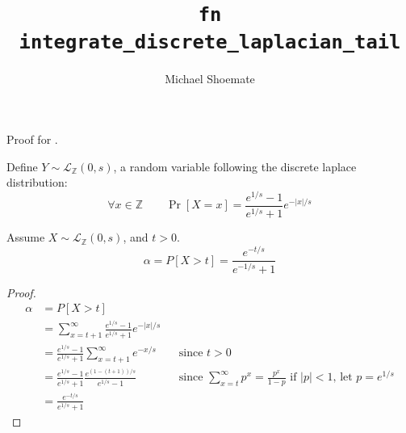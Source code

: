 \documentclass{article}
\title{\texttt{fn integrate\_discrete\_laplacian\_tail}}
\author{Michael Shoemate}
\begin{document}
\maketitle

Proof for .

\begin{definition}
    Define $Y \sim \mathcal{L}_\mathbb{Z}(0, s)$, a random variable following the discrete laplace distribution:
    \begin{equation}
        \forall x \in \mathbb{Z} \qquad \Pr[X = x] = \frac{e^{1/s} - 1}{e^{1/s} + 1} e^{-|x|/s}
    \end{equation}
\end{definition}

\begin{theorem}
    Assume $X \sim \mathcal{L}_\mathbb{Z}(0, s)$, and $t > 0$.
    \begin{equation}
        \alpha = P[X > t] = \frac{e^{-t/s}}{e^{-1/s} + 1}
    \end{equation}
\end{theorem}

\begin{proof}
    \begin{align*}
        \alpha &= P[X > t] \\
        &= \sum_{x=t + 1}^{\infty} \frac{e^{1/s} - 1}{e^{1/s} + 1} e^{-|x|/s} \\
        &= \frac{e^{1/s} - 1}{e^{1/s} + 1} \sum_{x=t + 1}^{\infty} e^{-x/s} 
            && \text{since } t > 0 \\
        &= \frac{e^{1/s} - 1}{e^{1/s} + 1} \frac{e^{(1-(t + 1))/s}}{e^{1/s} - 1} 
            && \text{since } \sum_{x=t}^\infty p^x = \frac{p^x}{1 - p} \text{ if } |p| < 1 \text{, let } p = e^{1/s}\\
        &= \frac{e^{-t/s}}{e^{1/s} + 1}
    \end{align*}

\end{proof}
\end{document}
